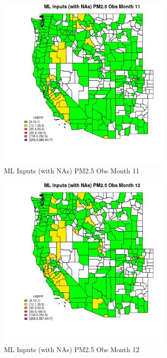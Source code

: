\clearpage 

\begin{figure} 
\centering  
\includegraphics[width=0.77\textwidth]{Code_Outputs/Report_ML_input_PM25_Step4_part_e_de_duplicated_aves_compiled_2019-05-20wNAs_CountyPM25_ObsmedianMonth11.jpg} 
\caption{\label{fig:Report_ML_input_PM25_Step4_part_e_de_duplicated_aves_compiled_2019-05-20wNAsCountyPM25_ObsmedianMonth11}ML Inputs (with NAs) PM2.5 Obs Month 11} 
\end{figure} 
 

\begin{figure} 
\centering  
\includegraphics[width=0.77\textwidth]{Code_Outputs/Report_ML_input_PM25_Step4_part_e_de_duplicated_aves_compiled_2019-05-20wNAs_CountyPM25_ObsmedianMonth12.jpg} 
\caption{\label{fig:Report_ML_input_PM25_Step4_part_e_de_duplicated_aves_compiled_2019-05-20wNAsCountyPM25_ObsmedianMonth12}ML Inputs (with NAs) PM2.5 Obs Month 12} 
\end{figure} 
 

